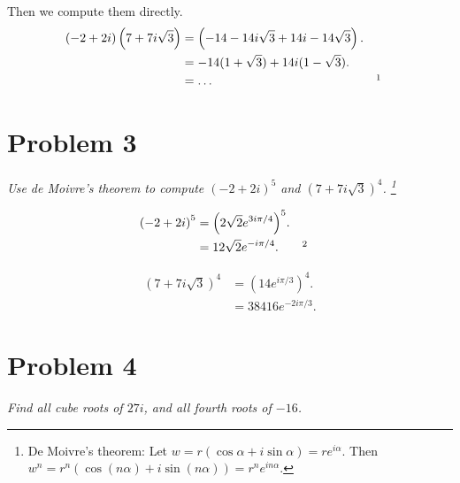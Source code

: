 \documentclass{tufte-handout}
\begin{document}
Then we compute them directly.
\begin{align*}
  (-2 + 2i)\left(7 + 7i\sqrt 3 \right) &= \left(-14 - 14 i \sqrt 3 + 14i
                                         -14 \sqrt 3\right).\\
                                       &= -14(1 + \sqrt 3) + 14i(1 -
                                         \sqrt 3).\\
                                       &= \ldots && \footnotemark
\end{align*}

\section{Problem 3}

\begin{description}
\item \textit{Use de Moivre's theorem to compute $(-2 + 2i)^5$ and
    $(7 + 7i\sqrt 3)^4$. \footnote{De Moivre's theorem: Let
      $w = r(\cos\alpha + i\sin\alpha) = re^{i\alpha}.$ Then
      $w^n = r^n(\cos(n\alpha) + i\sin(n\alpha)) = r^n
      e^{in\alpha}$.}}
\end{description}

\begin{align*}
  {(-2 + 2i)}^5 &= {\left(2 \sqrt 2 e^{3 i \pi / 4} \right)}^5.\\
                &= 12 \sqrt 2 e^{-i \pi / 4}. && \footnotemark
\end{align*}

\begin{align*}
  {\left( 7 + 7 i \sqrt 3 \right)}^4 &= {\left( 14 e^{i \pi / 3}
                                       \right)}^4.\\
                                     &= 38416 e^{-2 i \pi / 3}.
\end{align*}

\section{Problem 4}

\begin{description}
\item \textit{Find all cube roots of $27i$, and all fourth roots of
    $-16$.}
\end{description}
\end{document}

